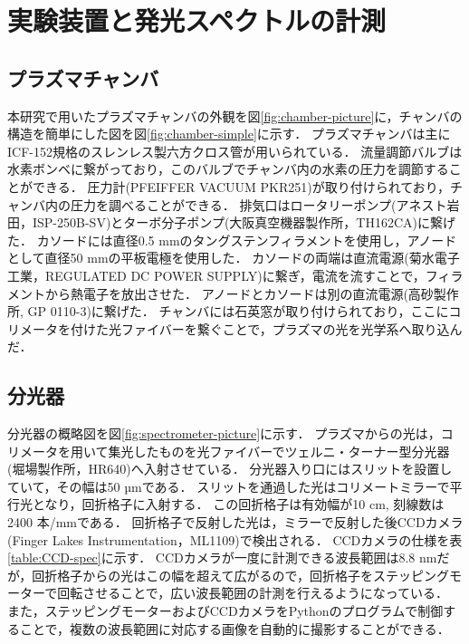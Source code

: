 \chapter{実験装置と発光スペクトルの計測}
\section{プラズマチャンバ}
本研究で用いたプラズマチャンバの外観を図\ref{fig:chamber-picture}に，チャンバの構造を簡単にした図を図\ref{fig:chamber-simple}に示す．
プラズマチャンバは主にICF-152規格のスレンレス製六方クロス管が用いられている．
流量調節バルブは水素ボンベに繋がっており，このバルブでチャンバ内の水素の圧力を調節することができる．
圧力計(PFEIFFER VACUUM PKR251)が取り付けられており，チャンバ内の圧力を調べることができる．
排気口はロータリーポンプ(アネスト岩田，ISP-250B-SV)とターボ分子ポンプ(大阪真空機器製作所，TH162CA)に繋げた．
カソードには直径0.5 mmのタングステンフィラメントを使用し，アノードとして直径50 mmの平板電極を使用した．
カソードの両端は直流電源(菊水電子工業，REGULATED DC POWER SUPPLY)に繋ぎ，電流を流すことで，フィラメントから熱電子を放出させた．
アノードとカソードは別の直流電源(高砂製作所, GP 0110-3)に繋げた．
チャンバには石英窓が取り付けられており，ここにコリメータを付けた光ファイバーを繋ぐことで，プラズマの光を光学系へ取り込んだ．

\section{分光器}
分光器の概略図を図\ref{fig:spectrometer-picture}に示す．
プラズマからの光は，コリメータを用いて集光したものを光ファイバーでツェルニ・ターナー型分光器(堀場製作所，HR640)へ入射させている．
分光器入り口にはスリットを設置していて，その幅は50 µmである．
スリットを通過した光はコリメートミラーで平行光となり，回折格子に入射する．
この回折格子は有効幅が10 cm, 刻線数は2400 本/mmである．
回折格子で反射した光は，ミラーで反射した後CCDカメラ(Finger Lakes Instrumentation，ML1109)で検出される．
CCDカメラの仕様\cite{CCD-spec}を表\ref{table:CCD-spec}に示す．
CCDカメラが一度に計測できる波長範囲は8.8 nmだが，回折格子からの光はこの幅を超えて広がるので，回折格子をステッピングモーターで回転させることで，広い波長範囲の計測を行えるようになっている．
また，ステッピングモーターおよびCCDカメラをPythonのプログラムで制御することで，複数の波長範囲に対応する画像を自動的に撮影することができる．

